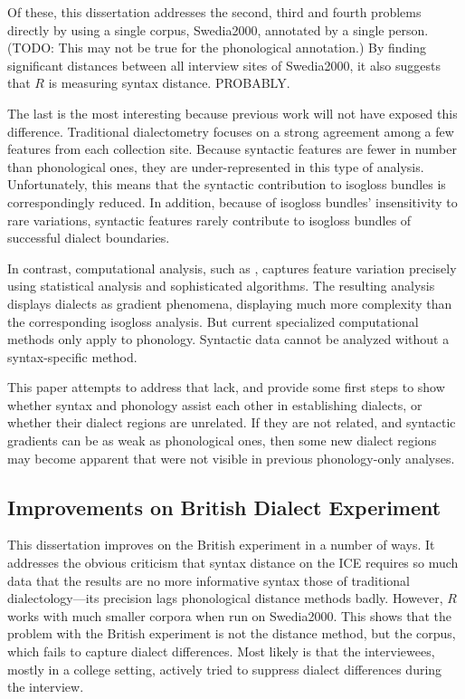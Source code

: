 Of these, this dissertation addresses the second, third and fourth
problems directly by using a single corpus, Swedia2000, annotated by a single
person. (TODO: This may not be true for the phonological annotation.)
By finding significant distances between all interview sites of
Swedia2000, it also suggests that $R$ is measuring syntax
distance. PROBABLY.

The last is the most interesting because previous work will not have
exposed this difference. Traditional dialectometry focuses on a strong
agreement among a few features from each collection site. Because
syntactic features are fewer in number than phonological ones, they
are under-represented in this type of analysis. Unfortunately, this
means that the syntactic contribution to isogloss bundles is
correspondingly reduced. In addition, because of isogloss bundles'
insensitivity to rare variations, syntactic features rarely contribute
to isogloss bundles of successful dialect boundaries.

In contrast, computational analysis, such as \cite{shackleton07},
captures feature variation precisely using statistical analysis and
sophisticated algorithms. The resulting analysis displays dialects as
gradient phenomena, displaying much more complexity than the
corresponding isogloss analysis. But current specialized computational
methods only apply to phonology. Syntactic data cannot be analyzed
without a syntax-specific method.

This paper attempts to address that lack, and provide some first steps
to show whether syntax and phonology assist each other in establishing
dialects, or whether their dialect regions are unrelated. If they are not
related, and syntactic gradients can be as weak as phonological ones,
then some new dialect regions may become apparent that were not visible in
previous phonology-only analyses.

\subsection{Improvements on British Dialect Experiment}

This dissertation improves on the British experiment in a number of
ways. It addresses the obvious criticism that syntax distance on the
ICE requires so much data that the results are no more informative
syntax those of traditional dialectology---its precision lags
phonological distance methods badly. However, $R$ works with much
smaller corpora when run on Swedia2000. This shows that the problem
with the British experiment is not the distance method, but the
corpus, which fails to capture dialect differences. Most likely is
that the interviewees, mostly in a college setting, actively tried to
suppress dialect differences during the interview.

